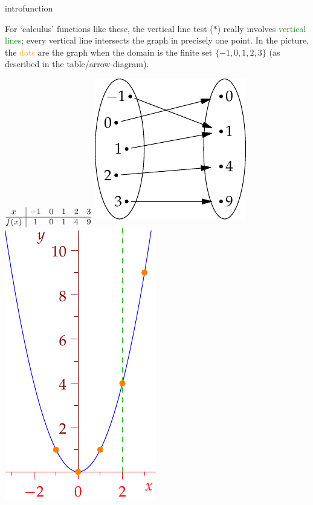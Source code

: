 \begin{example}{}{introfunction}
\begin{description}
\begin{minipage}[t]{0.71\linewidth}
			For `calculus' functions like these, the vertical line test ($\ast$) really involves \textcolor{Green}{vertical lines}; every vertical line intersects the graph in precisely one point.
			\smallbreak
			In the picture, the \textcolor{orange}{dots} are the graph when the domain is the finite set $\{-1,0,1,2,3\}$ (as described in the table/arrow-diagram).
	  \end{minipage}
	  \hfill
	  \begin{minipage}[t]{0.28\linewidth}\vspace{0pt}
	  	\flushright
	  	$\begin{array}{@{}c|ccccc@{}}
				x&-1&0&1&2&3\\\hline
				f(x)&1&0&1&4&9
			\end{array}$
			\bigbreak
			\includegraphics[scale=0.95]{functions-quad2}\bigbreak
			\includegraphics[scale=0.95]{functions-quad}
	  \end{minipage}
	\end{description}
\end{example}

